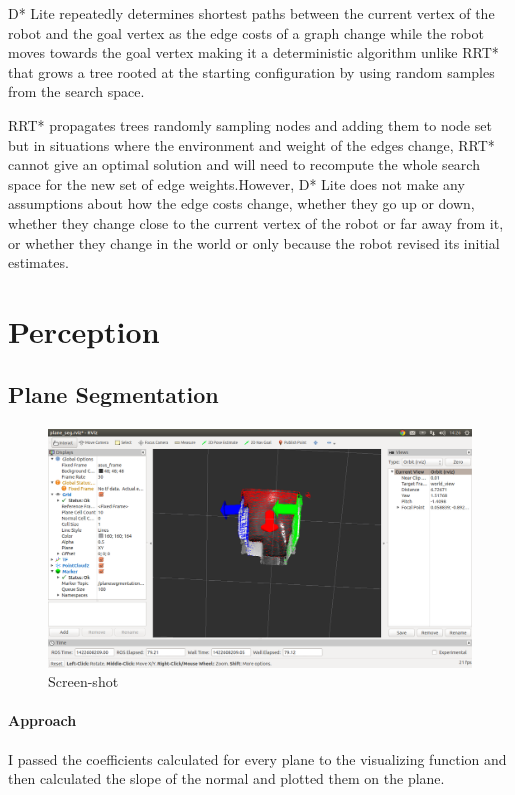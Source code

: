 \documentclass[paper=a4, fontsize=11pt]{scrartcl} %
\numberwithin{equation}{section} %
\numberwithin{figure}{section} %
\numberwithin{table}{section} %
\begin{document}
\begin{itemize}
D* Lite repeatedly determines shortest paths between the current vertex of the robot and the goal vertex as the edge costs of a graph change while the robot moves towards the goal vertex making it a deterministic algorithm unlike RRT* that grows a tree rooted at the starting configuration by using random samples from the search space. 

RRT* propagates trees randomly sampling nodes and adding them to node set but in situations where the environment and weight of the edges change, RRT* cannot give an optimal solution and will need to recompute the whole search space for the new set of edge weights.However, D* Lite does not make any assumptions about how the edge costs change, whether they go up or down, whether they change close to the current vertex of the robot or far away from it, or whether they change in the world or only because the robot revised its initial estimates. 

\end{itemize}

\section{Perception}
\subsection{Plane Segmentation}

\paragraph{}

\begin{figure}[b]
\includegraphics[scale = 0.33,bb = 0 0 0 0]{screenshot.png}
\caption{Screen-shot}
\end{figure}

\paragraph{Approach}
I passed the coefficients calculated for every plane to the visualizing function and then calculated the slope of the normal and plotted them on the plane.
\end{document}
